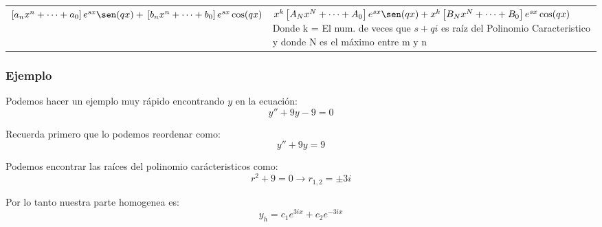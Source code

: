 \documentclass[12pt]{report}                               %
\begin{document}
\begin{longtable}{p{70mm} || p{90mm}}
         
            $\left[a_nx^n+\cdots+a_0\right]e^{sx}\sen(qx) +                                         \newline
            \left[b_nx^n+\cdots+b_0\right]e^{sx}\cos(qx)$                                           &

            $x^k \left[A_Nx^N+\cdots+A_0\right]e^{sx}\sen(qx) +                                     \newline
             x^k \left[B_Nx^N+\cdots+B_0\right]e^{sx}\cos(qx) $                                     \newline
            \tiny                                                                                   \newline
            \footnotesize Donde k = El num. de veces que $s+qi$ es raíz del
            Polinomio Caracteristico y donde N es el máximo entre m y n                             \\ [6.0ex]
         
        \end{longtable}


        \clearpage
        \subsubsection{Ejemplo}
            Podemos hacer un ejemplo muy rápido encontrando $y$ en la ecuación:
            \begin{equation*}
                y'' + 9y -9 = 0
            \end{equation*}
            
            Recuerda primero que lo podemos reordenar como:
            \begin{equation*}
                y'' +9y = 9
            \end{equation*}

            Podemos encontrar las raíces del polinomio carácteristicos como:
            \begin{equation*}
                r^2 + 9 = 0 \to r_{1,2} = \pm 3i
            \end{equation*}

            Por lo tanto nuestra parte homogenea es:
            \begin{equation*}
                y_h = c_1 e^{3ix} + c_2 e^{-3ix} 
            \end{equation*}
\end{document}
